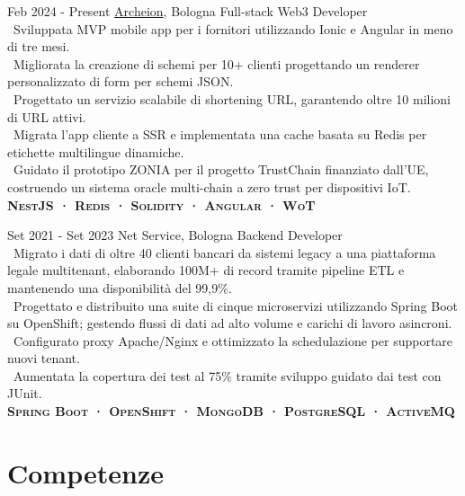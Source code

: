 \documentclass{tccv}
\begin{document}
\begin{eventlist}

     \item{Feb 2024 - Present}
     {\href{https://archeion.tech/}{Archeion}, Bologna}
     {Full-stack Web3 Developer} \\
     \textbullet~Sviluppata MVP mobile app per i fornitori utilizzando Ionic e Angular in meno di tre mesi.\\
     \textbullet~Migliorata la creazione di schemi per 10+ clienti progettando un renderer personalizzato di form per schemi JSON.\\
     \textbullet~Progettato un servizio scalabile di shortening URL, garantendo oltre 10 milioni di URL attivi.\\
     \textbullet~Migrata l'app cliente a SSR e implementata una cache basata su Redis per etichette multilingue dinamiche.\\
     \textbullet~Guidato il prototipo ZONIA per il progetto TrustChain finanziato dall'UE, costruendo un sistema oracle multi-chain a zero trust per dispositivi IoT.\\
     \textbf{\textsc{NestJS · Redis · Solidity · Angular · WoT}}

     \item{Set 2021 - Set 2023}
     {Net Service, Bologna}
     {Backend Developer} \\
     \textbullet~Migrato i dati di oltre 40 clienti bancari da sistemi legacy a una piattaforma legale multitenant, elaborando 100M+ di record tramite pipeline ETL e mantenendo una disponibilità del 99,9\%. \\
     \textbullet~Progettato e distribuito una suite di cinque microservizi utilizzando Spring Boot su OpenShift; gestendo flussi di dati ad alto volume e carichi di lavoro asincroni.\\
     \textbullet~Configurato proxy Apache/Nginx e ottimizzato la schedulazione per supportare nuovi tenant. \\
     \textbullet~Aumentata la copertura dei test al 75\% tramite sviluppo guidato dai test con JUnit.\\
     \textbf{\textsc{Spring Boot · OpenShift · MongoDB · PostgreSQL · ActiveMQ}}

\end{eventlist}

\section{Competenze}
\end{document}
